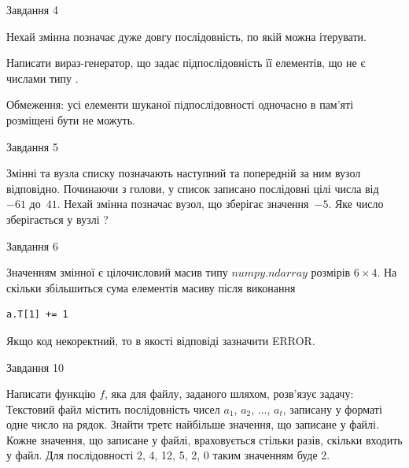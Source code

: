 \documentclass[12pt, ukrainian]{article}
\begin{document}
{               
{\begin{center}Завдання {4}\end{center}}
\vspace{-6mm}
Нехай змінна  позначає дуже довгу послідовність, по якій можна ітерувати.

Написати вираз-генератор, що задає підпослідовність її елементів, що не є числами типу .

Обмеження: усі елементи шуканої підпослідовності одночасно в пам'яті розміщені бути не можуть.\par

\vspace{10mm}
               
{\begin{center}Завдання {5}\end{center}}
\vspace{-6mm}
Змінні  та  вузла списку позначають наступний та попередній за ним вузол відповідно. Починаючи з голови, у список записано послідовні цілі числа від~$-61$ до~$41$. Нехай змінна  позначає вузол, що зберігає значення~$-5$.
Яке число зберігається у вузлі  ?\par

               
{\begin{center}Завдання {6}\end{center}}
\vspace{-6mm}
Значенням змінної  є цілочисловий масив типу $numpy.ndarray$ розмірів $6{\times}4$. На скільки збільшиться сума елементів масиву  після виконання
\begin{verbatim}
a.T[1] += 1
\end{verbatim}


Якщо код некоректний, то в якості відповіді зазначити ERROR.\par

               
{\begin{center}Завдання {10}\end{center}}
\vspace{-6mm}

Написати функцію $f$, яка для файлу, заданого шляхом, розв’язує задачу:\\ Текстовий файл містить послідовність чисел $a_1$, $a_2$, $\ldots$, $a_t$, записану у форматі одне число на рядок. Знайти третє найбільше значення, що записане у файлі. Кожне значення, що записане у файлі, враховується стільки разів, скільки входить у файл. Для послідовності 2, 4, 12, 5, 2, 0 таким значенням буде 2.

}
\end{document}
